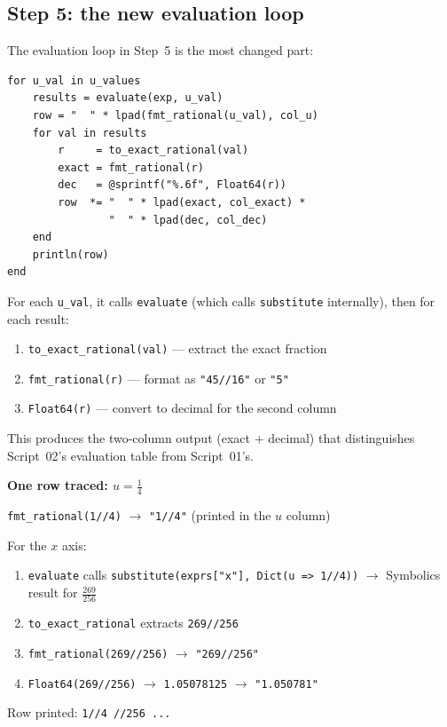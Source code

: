 \documentclass[12pt, a4paper]{article}
\newcommand{\cd}[1]{\texttt{#1}}
\begin{document}
\subsection{Step 5: the new evaluation loop}

The evaluation loop in Step~5 is the most changed part:

\begin{verbatim}
for u_val in u_values
    results = evaluate(exp, u_val)
    row = "  " * lpad(fmt_rational(u_val), col_u)
    for val in results
        r     = to_exact_rational(val)
        exact = fmt_rational(r)
        dec   = @sprintf("%.6f", Float64(r))
        row  *= "  " * lpad(exact, col_exact) *
                "  " * lpad(dec, col_dec)
    end
    println(row)
end
\end{verbatim}

For each \cd{u\_val}, it calls \cd{evaluate} (which calls
\cd{substitute} internally), then for each result:

\begin{enumerate}
  \item \cd{to\_exact\_rational(val)} --- extract the exact fraction
  \item \cd{fmt\_rational(r)} --- format as \cd{"45//16"} or \cd{"5"}
  \item \cd{Float64(r)} --- convert to decimal for the second column
\end{enumerate}

This produces the two-column output (exact + decimal) that
distinguishes Script~02's evaluation table from Script~01's.

\begin{examplebox}
\textbf{One row traced: $u = \tfrac{1}{4}$}

\medskip
\cd{fmt\_rational(1//4)} $\to$ \cd{"1//4"} (printed in the $u$ column)

For the $x$ axis:
\begin{enumerate}
  \item \cd{evaluate} calls \cd{substitute(exprs["x"], Dict(u => 1//4))}
        $\to$ Symbolics result for $\tfrac{269}{256}$
  \item \cd{to\_exact\_rational} extracts \cd{269//256}
  \item \cd{fmt\_rational(269//256)} $\to$ \cd{"269//256"}
  \item \cd{Float64(269//256)} $\to$ \cd{1.05078125} $\to$ \cd{"1.050781"}
\end{enumerate}
Row printed: \cd{1//4 //256  \quad ...}
\end{examplebox}
\end{document}
